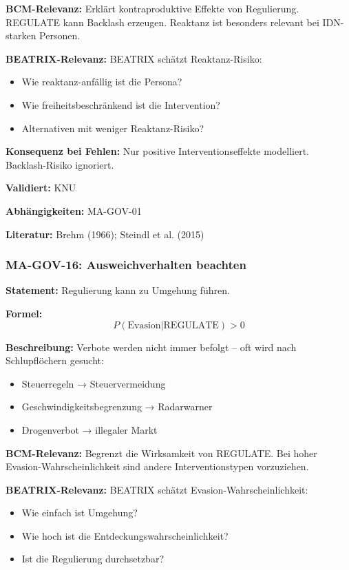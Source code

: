 \textbf{BCM-Relevanz:}
Erklärt kontraproduktive Effekte von Regulierung. REGULATE kann Backlash erzeugen. Reaktanz ist besonders relevant bei IDN-starken Personen.

\textbf{BEATRIX-Relevanz:}
BEATRIX schätzt Reaktanz-Risiko:
\begin{itemize}
    \item Wie reaktanz-anfällig ist die Persona?
    \item Wie freiheitsbeschränkend ist die Intervention?
    \item Alternativen mit weniger Reaktanz-Risiko?
\end{itemize}

\textbf{Konsequenz bei Fehlen:}
Nur positive Interventionseffekte modelliert. Backlash-Risiko ignoriert.

\textbf{Validiert:} KNU

\textbf{Abhängigkeiten:} MA-GOV-01

\textbf{Literatur:} Brehm (1966); Steindl et al. (2015)


\subsubsection*{MA-GOV-16: Ausweichverhalten beachten}

\textbf{Statement:} Regulierung kann zu Umgehung führen.

\textbf{Formel:}
\begin{equation}
P(\text{Evasion}|\text{REGULATE}) > 0
\end{equation}

\textbf{Beschreibung:}
Verbote werden nicht immer befolgt -- oft wird nach Schlupflöchern gesucht:
\begin{itemize}
    \item Steuerregeln → Steuervermeidung
    \item Geschwindigkeitsbegrenzung → Radarwarner
    \item Drogenverbot → illegaler Markt
\end{itemize}

\textbf{BCM-Relevanz:}
Begrenzt die Wirksamkeit von REGULATE. Bei hoher Evasion-Wahrscheinlichkeit sind andere Interventionstypen vorzuziehen.

\textbf{BEATRIX-Relevanz:}
BEATRIX schätzt Evasion-Wahrscheinlichkeit:
\begin{itemize}
    \item Wie einfach ist Umgehung?
    \item Wie hoch ist die Entdeckungswahrscheinlichkeit?
    \item Ist die Regulierung durchsetzbar?
\end{itemize}

